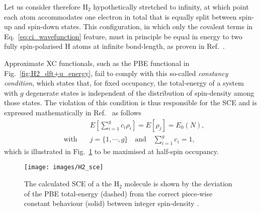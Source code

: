 {{Let us consider therefore H$_2$ 
hypothetically stretched to infinity, 
at which point each atom accommodates one electron in total 
that is equally split between spin-up and spin-down states.
%
This configuration, 
in which only the covalent terms 
in Eq.~\eqref{eq:ci_wavefunction} feature, 
must in principle be equal in energy 
to two fully spin-polarised H atoms at infinite bond-length, 
as proven in Ref.~\cite{doi:10.1063/1.2987202}.}
%

{Approximate XC functionals, 
such as the PBE functional in Fig.~\ref{fig:H2_dft+u_energy}, 
fail to comply with this so-called {\it constancy condition}, 
which states that, 
for fixed occupancy, 
the total-energy of a system  
with $g$ degenerate states 
is independent of the distribution 
of spin-density among those states.
%
The violation of this condition 
is thus responsible for the SCE 
and is expressed mathematically 
in Ref.~\cite{doi:10.1063/1.2987202} 
as follows 
%
\begin{align}
&E\left[\sum_{i=1}^g c_i\rho_i\right]=E[\rho_j]=E_0(N),\nonumber \\[0.5em]
\quad\mbox{with}\quad&
j=\{1,\cdots, g\}
\quad\mbox{and}\quad
\sum_{i=1}^g c_i=1, 
\end{align}
%
which is illustrated in Fig.~\ref{fig:H2_sce} 
to be maximised at half-spin occupancy.}
%


\begin{figure}[th!]
\centering
\texttt{[image: images/H2\_sce]}
\caption[SCE of a H$_2$ molecule as the deviation from piece-wise constancy]
{The calculated SCE of a the H$_2$ molecule  
 is shown by the deviation 
 of the PBE total-energy (dashed) 
 from the correct piece-wise constant behaviour (solid)
 between integer spin-density .}
\label{fig:H2_sce}
\end{figure}

%
%

%

}
